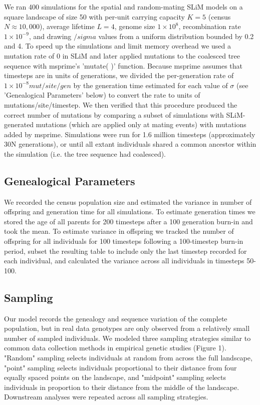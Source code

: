 \documentclass[9pt,twocolumn,twoside,lineno]{gsajnl}
\newif\ifcomments
\newcommand{\cjb}[1]{\ifcomments{{\color{blue} \it (#1)}}\else{}\fi}
\begin{document}
We ran 400 simulations for the spatial and random-mating SLiM models on a square landscape of size 50 with per-unit carrying capacity $K=5$ (census $N \approx 10,000$), average lifetime $L=4$, genome size $1\times10^{8}$, recombination rate $1\times10^{-9}$, and drawing $/sigma$ values from a uniform distribution bounded by 0.2 and 4. To speed up the simulations and limit memory overhead we used a mutation rate of 0 in SLiM and later applied mutations to the coalesced tree sequence with msprime's 'mutate( )' function. Because msprime assumes that timesteps are in units of generations, we divided the per-generation rate of $1\times10^{-8} mut/site/gen$ by the generation time estimated for each value of $\sigma$ (see 'Genealogical Parameters' below) to convert the rate to units of mutations/site/timestep. We then verified that this procedure produced the correct number of mutations by comparing a subset of simulations with SLiM-generated mutations (which are applied only at mating events) with mutations added by msprime. Simulations were run for 1.6 million timesteps (approximately 30N generations), or until all extant individuals shared a common ancestor within the simulation (i.e. the tree sequence had coalesced). 

\subsection{Genealogical Parameters}
We recorded the census population size and estimated the variance in number of offspring and generation time for all simulations. To estimate generation times we stored the age of all parents for 200 timesteps after a 100 generation burn-in and took the mean. To estimate variance in offspring we tracked the number of offspring for all individuals for 100 timesteps following a 100-timestep burn-in period, subset the resulting table to include only the last timestep recorded for each individual, and calculated the variance across all individuals in timesteps 50-100.

\cjb{Would it be worthwhile to calculate the rate of spread of ancestry as a function of neighborhood size? IE how long until an individual in the middle of the map has ancestors in every region?}

\subsection{Sampling}
Our model records the genealogy and sequence variation of the complete population, but in real data genotypes are only observed from a relatively small number of sampled individuals. We modeled three sampling strategies similar to common data collection methods in empirical genetic studies (Figure 1). "Random" sampling selects individuals at random from across the full landscape, "point" sampling selects individuals proportional to their distance from four equally spaced points on the landscape, and "midpoint" sampling selects individuals in proportion to their distance from the middle of the landscape. Downstream analyses were repeated across all sampling strategies. 
\end{document}
